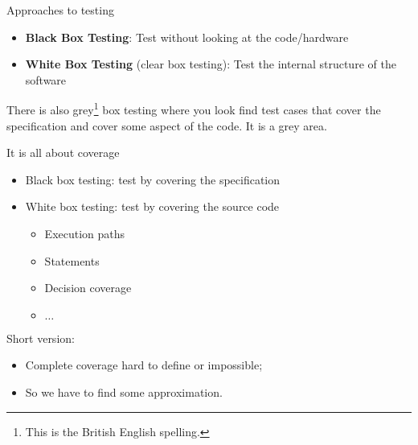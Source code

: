 \documentclass[handout]{beamer}
\begin{document}
\begin{frame}{Approaches to testing}
  \begin{itemize}
  \item {\bf Black Box Testing}: Test without looking at the code/hardware
  \item {\bf White Box Testing} (clear box testing):  Test the internal
    structure of the software
  \end{itemize}
  There is also grey\footnote{This is the British English spelling.} box testing where you look find test cases that cover the
  specification and cover some aspect of the code.  It is a grey area.  
\end{frame}
\begin{frame}{It is all about coverage}
  \begin{itemize}
  \item Black box testing: test by covering the specification
  \item White box testing: test by covering the source code
    \begin{itemize}
    \item Execution paths
    \item Statements
    \item Decision coverage
    \item $\ldots$
    \end{itemize}
  \end{itemize}
  Short version:
  \begin{itemize}
  \item  Complete coverage hard to define or impossible;
  \item  So we have to find some approximation.
  \end{itemize}
\end{frame}
\end{document}

